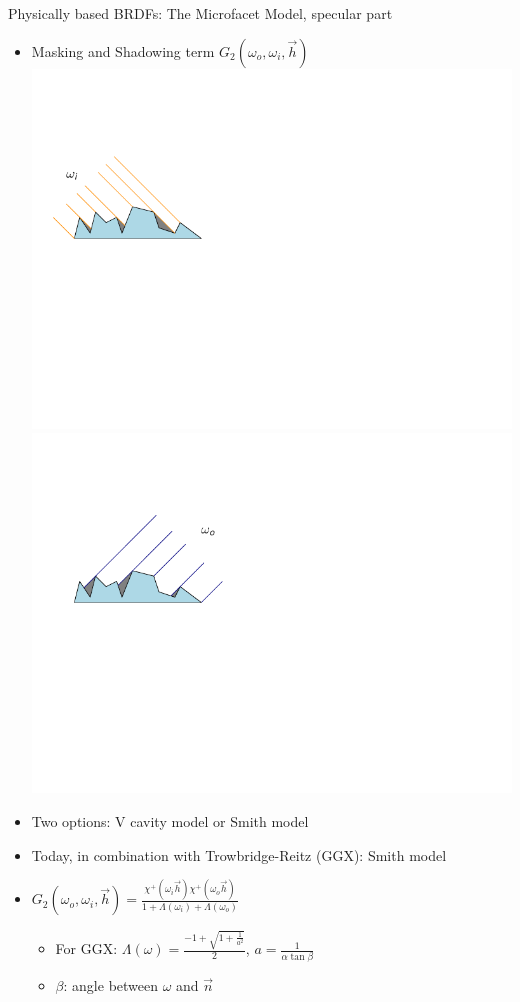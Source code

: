 \documentclass[utf8,stillsansserifmath,fleqn,t]{beamer}
\newcommand{\ds}{\displaystyle}
\begin{document}
\begin{frame}
\frametitle{\insertsection}
Physically based BRDFs: The Microfacet Model, specular part
\begin{itemize}
\item Masking and Shadowing term $G_2(\omega_o,\omega_i,\vec{h})$\\
\includegraphics[width=.4\textwidth]{./fig/masking.pdf}\hfill
\includegraphics[width=.4\textwidth]{./fig/shadowing.pdf}
    \item Two options: V cavity model or Smith model
    \item Today, in combination with Trowbridge-Reitz (GGX): Smith model
    \item $\ds G_2(\omega_o,\omega_i,\vec{h}) = \frac{\chi^{+}(\omega_i\vec{h})\chi^{+}(\omega_o\vec{h})}%
    {1+\Lambda(\omega_i)+\Lambda(\omega_o)}$
        \begin{itemize}
        \item For GGX: $\Lambda(\omega)=\frac{-1+\sqrt{1+\frac{1}{a^2}}}{2}$, $a=\frac{1}{\alpha\tan\beta}$
        \item $\beta$: angle between $\omega$ and $\vec{n}$
        \end{itemize}
\end{itemize}
\end{frame}
\end{document}

